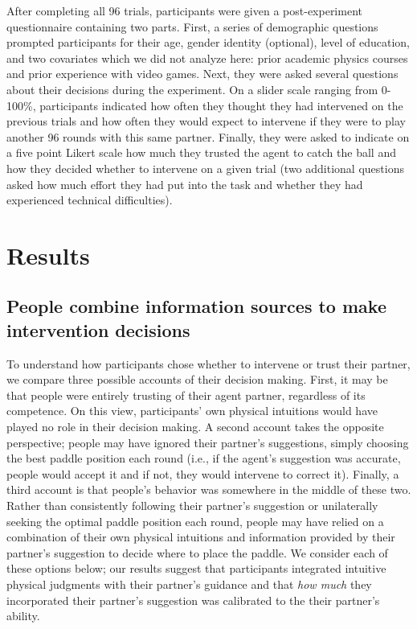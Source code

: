 \documentclass[10pt,letterpaper]{article}
\begin{document}
After completing all 96 trials, participants were given a post-experiment questionnaire containing two parts. First, a series of demographic questions prompted participants for their age, gender identity (optional), level of education, and two covariates which we did not analyze here: prior academic physics courses and prior experience with video games. Next, they were asked several questions about their decisions during the experiment. On a slider scale ranging from 0-100\%, participants indicated how often they thought they had intervened on the previous trials and how often they would expect to intervene if they were to play another 96 rounds with this same partner. Finally, they were asked to indicate on a five point Likert scale how much they trusted the agent to catch the ball and how they decided whether to intervene on a given trial (two additional questions asked how much effort they had put into the task and whether they had experienced technical difficulties).



\section{Results}

\subsection{People combine information sources to make intervention decisions}

To understand how participants chose whether to intervene or trust their partner, we compare three possible accounts of their decision making. First, it may be that people were entirely trusting of their agent partner, regardless of its competence. On this view, participants' own physical intuitions would have played no role in their decision making. A second account takes the opposite perspective; people may have ignored their partner's suggestions, simply choosing the best paddle position each round (i.e., if the agent's suggestion was accurate, people would accept it and if not, they would intervene to correct it). Finally, a third account is that people's behavior was somewhere in the middle of these two. Rather than consistently following their partner's suggestion or unilaterally seeking the optimal paddle position each round, people may have relied on a combination of their own physical intuitions and information provided by their partner's suggestion to decide where to place the paddle. We consider each of these options below; our results suggest that participants integrated intuitive physical judgments with their partner's guidance and that \textit{how much} they incorporated their partner's suggestion was calibrated to the their partner's ability.
\end{document}

